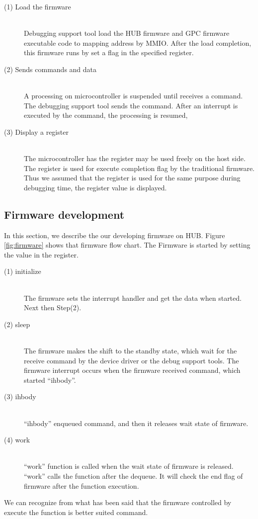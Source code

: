 \begin{description}
\item[ (1) Load the firmware]\mbox{}\\
Debugging support tool load the HUB firmware and GPC firmware executable code to mapping address by MMIO. 
After the load completion, this firmware runs by set a flag in the specified register.
\item[ (2) Sends commands and data]\mbox{}\\
A processing on microcontroller is suspended until receives a command.
The debugging support tool sends the command.
After an interrupt is executed by the command, the processing is resumed,

\item[ (3) Display a register] \mbox{}\\
The microcontroller has the register may be used freely on the host side.
The register is used for execute completion flag by the traditional firmware.
Thus we assumed that the register is used for the same purpose during debugging time, 
the register value is displayed.
\end{description}


\subsection{Firmware development}
In this section, we describe the our developing firmware on HUB.
Figure \ref{fig:firmware} shows that firmware flow chart.
The Firmware is started by setting the value in the register.

\begin{description}
\item[ (1) initialize]\mbox{}\\
The firmware sets the interrupt handler and get the data when started.
Next then Step(2).
\item[ (2) sleep]\mbox{}\\
The firmware makes the shift to the standby state, which wait for the receive command by the device driver or the debug support tools.
The firmware interrupt occurs when the firmware received command, which started ``ihbody''. 

\item[ (3) ihbody] \mbox{}\\
``ihbody'' enqueued command, and then it releases wait state of firmware.
\item[ (4) work] \mbox{}\\
``work'' function is called when the wait state of firmware is released.
``work'' calls the function after the dequeue.
It will check the end flag of firmware after the function execution.
\end{description}
We can recognize from what has been said that the firmware controlled by execute the function is better suited command.

